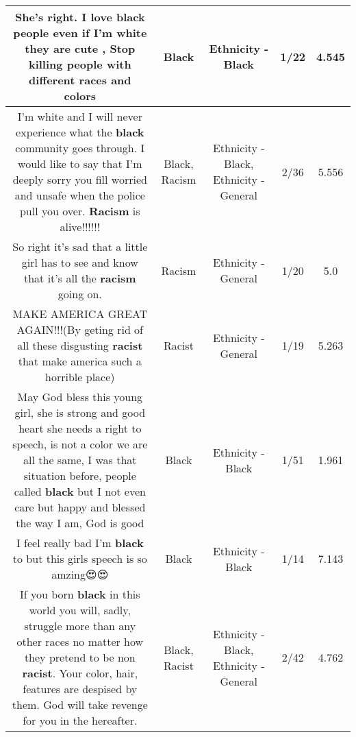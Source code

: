 \documentclass[11pt]{article}
\newlength\mylength
\begin{document}
\begin{center}
\begin{longtable}{|C{.65\mylength}|C{.30\mylength}|C{.12\mylength}|C{.12\mylength}|C{.12\mylength}|}
  \small She's right. I love \textbf{black} people even if I'm white they are cute , Stop killing people with different races and colors\normalsize   & Black & Ethnicity - Black & 1/22 & 4.545 \\  \hline
  \small I'm white and I will never experience what the \textbf{black} community goes through. I would like to say that I'm deeply sorry you fill worried and unsafe when the police pull you over. \textbf{Racism} is alive!!!!!!\normalsize   & Black, Racism & Ethnicity - Black, Ethnicity - General & 2/36 & 5.556 \\  \hline
  \small So right it's sad that a little girl has to see and know that it's all the \textbf{racism} going on.\normalsize   & Racism & Ethnicity - General & 1/20 & 5.0 \\  \hline
  \small MAKE AMERICA GREAT AGAIN!!!(By geting rid of all these disgusting \textbf{racist} that make america such a horrible place)\normalsize   & Racist & Ethnicity - General & 1/19 & 5.263 \\  \hline
  \small May God bless this young girl, she is strong and good heart she needs a right to speech, is not a color we are all the same, I was that situation before, people called \textbf{black} but I not even care but happy and blessed the way I am, God is good\normalsize   & Black & Ethnicity - Black & 1/51 & 1.961 \\  \hline
  \small I feel really bad I'm \textbf{black} to but this girls speech is so amzing😍😍\normalsize   & Black & Ethnicity - Black & 1/14 & 7.143 \\  \hline
  \small If you born \textbf{black} in this world you will, sadly, struggle more than any other races no matter how they pretend to be non \textbf{racist}. Your color, hair, features are despised by them. God will take revenge for you in the hereafter.\normalsize   & Black, Racist & Ethnicity - Black, Ethnicity - General & 2/42 & 4.762 \\  \hline

\end{longtable}
\end{center}
\end{document}
